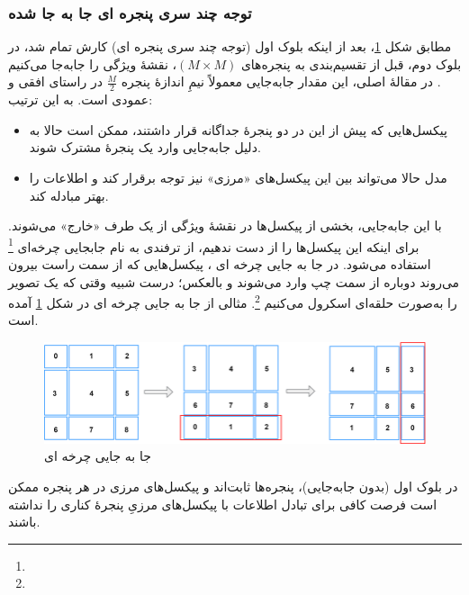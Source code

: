 \subsubsection{توجه چند سری پنجره ای جا به جا شده}
مطابق شکل \ref{fig:Cycle Shift in Swin Tranformer}، بعد از اینکه بلوک اول (توجه چند سری پنجره ای) کارش تمام شد، در بلوک دوم، قبل از تقسیم‌بندی به پنجره‌های 
\(\displaystyle (M \times M)\)، نقشهٔ ویژگی را جابه‌جا  می‌کنیم \cite{liu2021swintransformer}.
در مقالهٔ اصلی، این مقدار جابه‌جایی معمولاً نیمِ اندازهٔ پنجره 
\(\displaystyle \frac{M}{2}\)
در راستای افقی و عمودی است. به این ترتیب:

\begin{itemize}
	\item پیکسل‌هایی که پیش از این در دو پنجرهٔ جداگانه قرار داشتند، ممکن است حالا به دلیل جابه‌جایی وارد یک پنجرهٔ مشترک شوند.
	\item مدل حالا می‌تواند بین این پیکسل‌های «مرزی» نیز  توجه برقرار کند و اطلاعات را بهتر مبادله کند.
\end{itemize}

با این جابه‌جایی، بخشی از پیکسل‌ها در نقشهٔ ویژگی از یک طرف «خارج» می‌شوند. برای اینکه این پیکسل‌ها را از دست ندهیم، از ترفندی به نام  جابجایی چرخه‌ای \footnote{} استفاده می‌شود. در جا به جایی چرخه ای ، پیکسل‌هایی که از سمت راست بیرون می‌روند دوباره از سمت چپ وارد می‌شوند و بالعکس؛ درست شبیه وقتی که یک تصویر را به‌صورت حلقه‌ای اسکرول می‌کنیم \footnote{}. مثالی از جا به جایی چرخه ای  در شکل \ref{fig:Cycle Shift in Swin Tranformer} آمده است.

\begin{figure}[h]
	\centering
	\begin{minipage}[b]{1\textwidth}
		\centering
		\includegraphics[width=\textwidth]{transformer_images/cycle_shift.png}
		\caption{جا به جایی چرخه ای}
		\label{fig:Cycle Shift in Swin Tranformer}
	\end{minipage}
	\hfill
\end{figure}

در بلوک اول (بدون جابه‌جایی)، پنجره‌ها ثابت‌اند و پیکسل‌های مرزی در هر پنجره ممکن است فرصت کافی برای تبادل اطلاعات با پیکسل‌های مرزیِ پنجرهٔ کناری را نداشته باشند.

